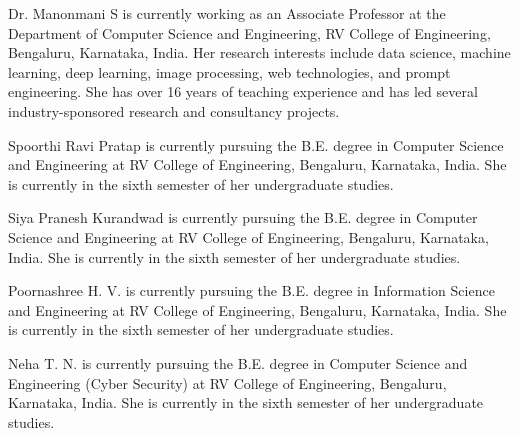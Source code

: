 \documentclass[oneside]{ieeeaccess}
\begin{document}
\begin{IEEEbiographynophoto}{Dr. Manonmani S} is currently working as an Associate Professor at the Department of Computer Science and Engineering, RV College of Engineering, Bengaluru, Karnataka, India. Her research interests include data science, machine learning, deep learning, image processing, web technologies, and prompt engineering. She has over 16 years of teaching experience and has led several industry-sponsored research and consultancy projects.
\end{IEEEbiographynophoto}
\begin{IEEEbiographynophoto}{Spoorthi Ravi Pratap} is currently pursuing the B.E. degree in Computer Science and Engineering at RV College of Engineering, Bengaluru, Karnataka, India. She is currently in the sixth semester of her undergraduate studies.
\end{IEEEbiographynophoto}
\begin{IEEEbiographynophoto}{Siya Pranesh Kurandwad} is currently pursuing the B.E. degree in Computer Science and Engineering at RV College of Engineering, Bengaluru, Karnataka, India. She is currently in the sixth semester of her undergraduate studies.
\end{IEEEbiographynophoto}
\begin{IEEEbiographynophoto}{Poornashree H. V.} is currently pursuing the B.E. degree in Information Science and Engineering at RV College of Engineering, Bengaluru, Karnataka, India. She is currently in the sixth semester of her undergraduate studies.
\end{IEEEbiographynophoto}
\begin{IEEEbiographynophoto}{Neha T. N.} is currently pursuing the B.E. degree in Computer Science and Engineering (Cyber Security) at RV College of Engineering, Bengaluru, Karnataka, India. She is currently in the sixth semester of her undergraduate studies.
\end{IEEEbiographynophoto}
\EOD
\end{document}

